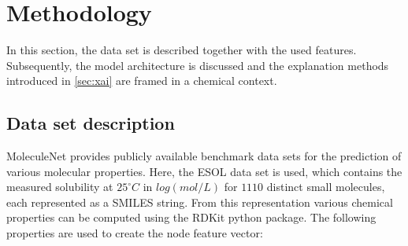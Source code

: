 \chapter{Methodology}


In this section, the data set is described together with the used features. 
Subsequently, the model architecture is discussed and the explanation methods 
introduced in \cref{sec:xai} are framed in a chemical context.


\section{Data set description}


MoleculeNet provides publicly available benchmark data sets for the prediction of 
various molecular properties.\cite{wu2018moleculenet} Here, the ESOL data set is used,
which contains the measured solubility at $25^{\circ} C$ in $log(mol/L)$ for $1110$ 
distinct small molecules, each represented as a SMILES string.\cite{delaney2004esol}
From this representation various chemical properties can be computed using the RDKit python package\cite{landrum2010r}. 
The following properties are used to create the node feature vector: \cite{wu2023chemistry}

